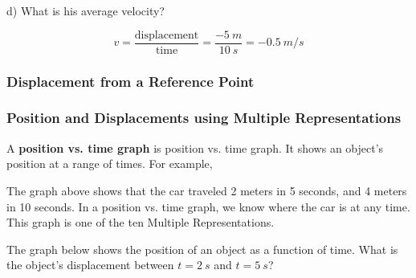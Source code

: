 \documentclass[dvipsnames]{article}
\begin{document}
d) What is his average velocity?

\begin{equation*}
    v = \frac{\text{displacement}}{\text{time}} = \frac{\SI{-5}{m}}{\SI{10}{s}} = \boxed{\SI{-0.5}{m/s}}
\end{equation*}

\subsubsection{Displacement from a Reference Point}

\subsubsection{Position and Displacements using Multiple Representations}

A \textbf{\gls{position vs. time graph}} is \glsdesc{position vs. time graph}. It shows an object's position at a range of times. For example, 

\begin{center}
\end{center}

The graph above shows that the car traveled 2 meters in 5 seconds, and 4 meters in 10 seconds. In a position vs. time graph, we know where the car is at any time. This graph is one of the ten Multiple Representations.



\begin{example}
The graph below shows the position of an object as a function of time. What is the object's displacement between $t = \SI{2}{s}$ and $t = \SI{5}{s}$?

\begin{center}
\end{center}
\end{example}
\end{document}
